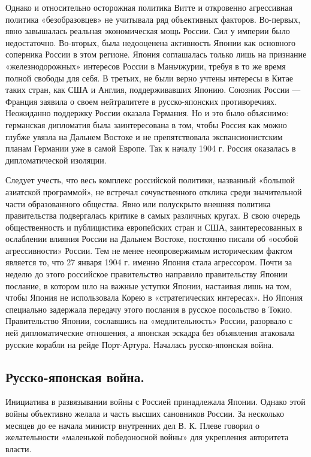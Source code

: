 \documentclass[12pt]{article}
\begin{document}
Однако и относительно осторожная политика Витте и откровенно агрессивная политика «безобразовцев» не учитывала ряд объективных факторов. Во-первых, явно завышалась реальная экономическая мощь России. Сил у империи было недостаточно. Во-вторых, была недооценена активность Японии как основного соперника России в этом регионе. Япония соглашалась только лишь на признание «железнодорожных» интересов России в Маньчжурии, требуя в то же время полной свободы для себя. В третьих, не были верно учтены интересы в Китае таких стран, как США и Англия, поддерживавших Японию. Союзник России — Франция заявила о своем нейтралитете в русско-японских противоречиях. Неожиданно поддержку России оказала Германия. Но и это было объяснимо: германская дипломатия была заинтересована в том, чтобы Россия как можно глубже увязла на Дальнем Востоке и не препятствовала экспансионистским планам Германии уже в самой Европе. Так к началу 1904 г. Россия оказалась в дипломатической изоляции.

Следует учесть, что весь комплекс российской политики, названный «большой азиатской программой», не встречал сочувственного отклика среди значительной части образованного общества. Явно или полускрыто внешняя политика правительства подвергалась критике в самых различных кругах. В свою очередь общественность и публицистика европейских стран и США, заинтересованных в ослаблении влияния России на Дальнем Востоке, постоянно писали об «особой агрессивности» России. Тем не менее неопровержимым историческим фактом является то, что 27 января 1904 г. именно Япония стала агрессором. Почти за неделю до этого российское правительство направило правительству Японии послание, в котором шло на важные уступки Японии, настаивая лишь на том, чтобы Япония не использовала Корею в «стратегических интересах». Но Япония специально задержала передачу этого послания в русское посольство в Токио. Правительство Японии, сославшись на «медлительность» России, разорвало с ней дипломатические отношения, а японская эскадра без объявления атаковала русские корабли на рейде Порт-Артура. Началась русско-японская война.

\newpage
\subsection{Русско-японская война. }

Инициатива в развязывании войны с Россией принадлежала Японии. Однако этой войны объективно желала и часть высших сановников России. За несколько месяцев до ее начала министр внутренних дел В. К. Плеве говорил   о   желательности   «маленькой   победоносной войны» для укрепления авторитета власти. 
\end{document}

